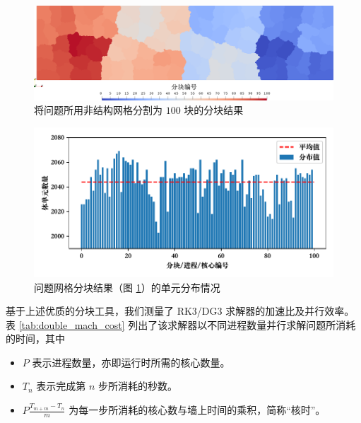 \begin{figure}[h!]
\begin{centering}
\includegraphics[width=1\textwidth,height=0.4\textheight,keepaspectratio]{figures/double_mach/partition}
\par\end{centering}
\caption{\label{fig:double_mach_partition}将问题所用非结构网格分割为
$100$ 块的分块结果}
\end{figure}

\begin{figure}[h!]
\begin{centering}
\includegraphics[width=1\textwidth,height=0.3\textheight,keepaspectratio]{figures/double_mach/balance}
\par\end{centering}
\caption{\label{fig:double_mach_balance}问题网格分块结果（图
\ref{fig:double_mach_partition}）的单元分布情况}
\end{figure}

基于上述优质的分块工具，我们测量了 RK3/DG3 求解器的加速比及并行效率。表 \ref{tab:double_mach_cost}
列出了该求解器以不同进程数量并行求解问题所消耗的时间，其中
\begin{itemize}
\item $P$ 表示进程数量，亦即运行时所需的核心数量。
\item $T_{n}$ 表示完成第 $n$ 步所消耗的秒数。
\item $P\frac{T_{m+m}-T_{n}}{m}$ 为每一步所消耗的核心数与墙上时间的乘积，简称“核时”。
\end{itemize}

